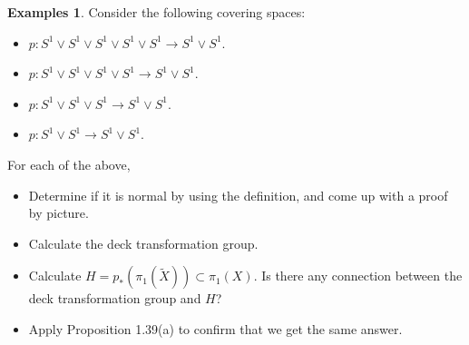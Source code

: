 \documentclass[12pt, psamsfonts]{amsart}
\theoremstyle{definition}
\newtheorem{exmps}[thm]{Examples}
\theoremstyle{remark}
\numberwithin{equation}{section}
\begin{document}
\begin{exmps}
  Consider the following covering spaces:
  
  \begin{itemize}
    \item
      $p: S^1 \vee S^1 \vee S^1 \vee S^1 \vee S^1 \rightarrow S^1 \vee S^1$.
    \item
      $p: S^1 \vee S^1 \vee S^1 \vee S^1 \rightarrow S^1 \vee S^1$.
    \item
      $p: S^1 \vee S^1 \vee S^1 \rightarrow S^1 \vee S^1$.
    \item
      $p: S^1 \vee S^1 \rightarrow S^1 \vee S^1$.
  \end{itemize}

  For each of the above,

  \begin{itemize}
    \item
      Determine if it is normal by using the definition, and come up with a proof by picture.
    \item
      Calculate the deck transformation group.
    \item
      Calculate $H = p_*(\pi_1(\tilde{X})) \subset \pi_1(X)$.
      Is there any connection between the deck transformation group and $H$?
    \item
      Apply Proposition 1.39(a) to confirm that we get the same answer.
  \end{itemize}
\end{exmps}
\end{document}
